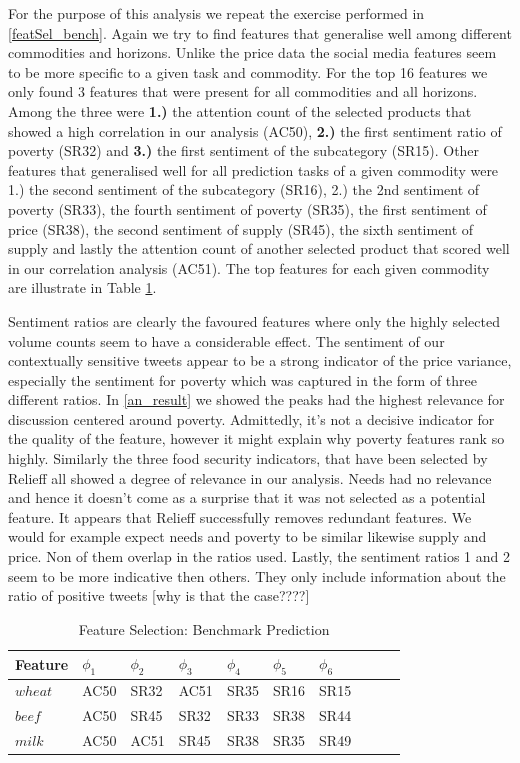 For the purpose of this analysis we repeat the exercise performed in \ref{featSel_bench}. Again we try to find features that generalise well among different commodities and horizons. Unlike the price data the social media features seem to be more specific to a given task and commodity. For the top 16 features we only found 3 features that were present for all commodities and all horizons. Among the three were \textbf{1.)} the attention count of the selected products that showed a high correlation in our analysis (AC50), \textbf{2.)} the first sentiment ratio of poverty (SR32) and \textbf{3.)} the first sentiment of the subcategory (SR15). Other features that generalised well for all prediction tasks of a given commodity were 1.) the second sentiment of the subcategory (SR16), 2.) the 2nd sentiment of poverty (SR33), the fourth sentiment of poverty (SR35), the first sentiment of price (SR38), the second sentiment of supply (SR45), the sixth sentiment of supply and lastly the attention count of another selected product that scored well in our correlation analysis (AC51). The top features for each given commodity are illustrate in Table \ref{tab:feat_mod2}.

Sentiment ratios are clearly the favoured features where only the highly selected volume counts seem to have a considerable effect. The sentiment of our contextually sensitive tweets appear to be a strong indicator of the price variance, especially the sentiment for poverty which was captured in the form of three different ratios. In \ref{an_result} we showed the peaks had the highest relevance for  discussion centered around poverty. Admittedly, it's not a decisive indicator for the quality of the feature, however it might explain why poverty features rank so highly. Similarly the three food security indicators, that have been selected by Relieff all showed a degree of relevance in our analysis. Needs had no relevance and hence it doesn't come as a surprise that it was not selected as a potential feature. It appears that Relieff successfully removes redundant features. We would for example expect needs and poverty to be similar likewise supply and price. Non of them overlap in the ratios used. Lastly, the sentiment ratios 1 and 2 seem to be more indicative then others. They only include information about the ratio of positive tweets [why is that the case????]


\begin{table}[H]
\centering
\begin{tabular}{ |p{2cm}|p{1cm}|p{1cm}|p{1cm}|p{1cm}|p{1cm}|p{1cm}|p{1cm}|p{1cm}|p{1cm}| }
  \hline
 Feature &  $\phi_1$ &  $\phi_2$ &  $\phi_3$ &  $\phi_4$ &  $\phi_5$&  $\phi_6$    \\
 \hline

 $wheat$ & AC50   & SR32   & AC51 &  SR35  & SR16 & SR15 \\
  \hline
  $beef$ & AC50 & SR45 & SR32 & SR33 & SR38 & SR44  \\
  \hline
  $milk$ & AC50 & AC51 & SR45 & SR38 & SR35 & SR49  \\

  \hline
 \end{tabular}
\caption{Feature Selection: Benchmark Prediction}
\label{tab:feat_mod2}
\end{table}


